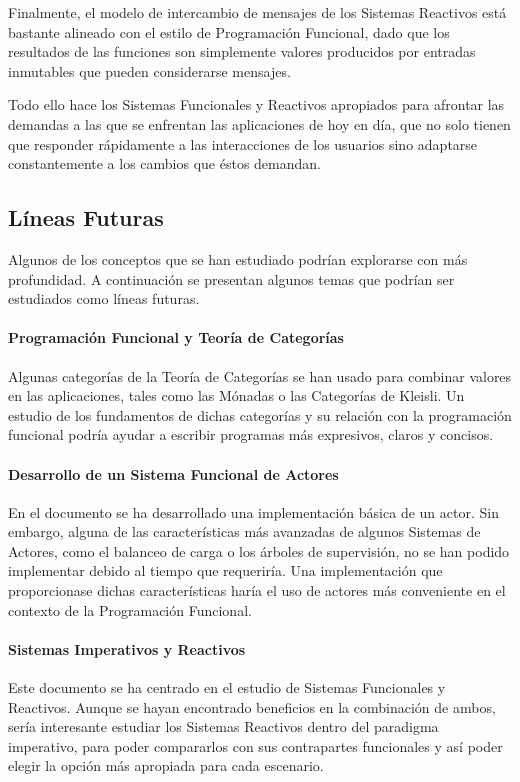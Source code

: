\documentclass[../main.tex]{subfiles}
\begin{document}
Finalmente, el modelo de intercambio de mensajes de los Sistemas Reactivos está bastante
alineado con el estilo de Programación Funcional, dado que los resultados de las funciones
son simplemente valores producidos por entradas inmutables que pueden considerarse mensajes.

Todo ello hace los Sistemas Funcionales y Reactivos apropiados para afrontar las demandas a las que
se enfrentan las aplicaciones de hoy en día, que no solo tienen que responder rápidamente
a las interacciones de los usuarios sino adaptarse constantemente a los cambios que éstos demandan.

\subsection{Líneas Futuras}
Algunos de los conceptos que se han estudiado podrían explorarse con más profundidad. A continuación
se presentan algunos temas que podrían ser estudiados como líneas futuras.


\paragraph{Programación Funcional y Teoría de Categorías}

Algunas categorías de la Teoría de Categorías se han usado para combinar valores
en las aplicaciones, tales como las Mónadas o las Categorías de Kleisli. Un estudio
de los fundamentos de dichas categorías y su relación con la programación funcional
podría ayudar a escribir programas más expresivos, claros y concisos.

\paragraph{Desarrollo de un Sistema Funcional de Actores}

En el documento se ha desarrollado una implementación básica de un actor. Sin embargo,
alguna de las características más avanzadas de algunos Sistemas de Actores, como el balanceo
de carga o los árboles de supervisión, no se han podido implementar debido al tiempo que
requeriría. Una implementación que proporcionase dichas características haría el uso de actores
más conveniente en el contexto de la Programación Funcional.

\paragraph{Sistemas Imperativos y Reactivos}
Este documento se ha centrado en el estudio de Sistemas Funcionales y Reactivos.
Aunque se hayan encontrado beneficios en la combinación de ambos, sería interesante
estudiar los Sistemas Reactivos dentro del paradigma imperativo, para poder compararlos con
sus contrapartes funcionales y así poder elegir la opción más apropiada para cada escenario.
\end{document}
